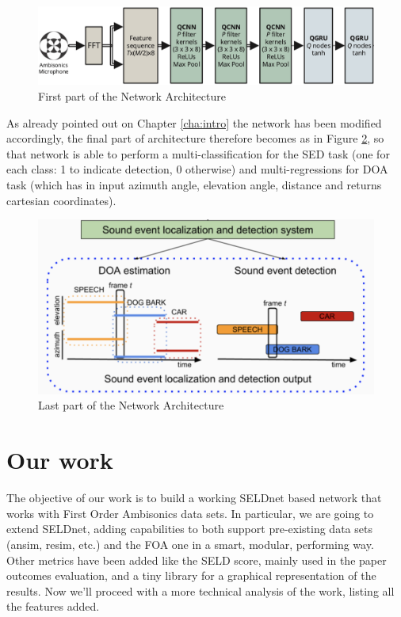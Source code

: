 \documentclass[11pt]{article}
\begin{document}
\begin{figure}[ht]
	\includegraphics[width=\linewidth]{img/arch1.png}
	\caption{First part of the Network Architecture}
	\label{fig:arch1}
\end{figure}

\noindent
As already pointed out on Chapter \ref{cha:intro} the network has been modified accordingly, the final part of architecture therefore becomes as in Figure \ref{fig:arch2}, so that network is able to perform a multi-classification for the SED task (one for each class: 1 to indicate detection, 0 otherwise) and multi-regressions for DOA task (which has in input azimuth angle, elevation angle, distance and returns cartesian coordinates).

\begin{figure}[ht]
	\centering
	\includegraphics[scale=0.5]{img/arch2.png}
	\caption{Last part of the Network Architecture}
	\label{fig:arch2}
\end{figure}

\newpage
\section{Our work}

The objective of our work is to build a working SELDnet based network that works with First Order Ambisonics data sets. In particular, we are going to extend SELDnet, adding capabilities to both support pre-existing data sets (ansim, resim, etc.) and the FOA one in a smart, modular, performing way. Other metrics have been added like the SELD score, mainly used in the paper \cite{paper2019} outcomes evaluation, and a tiny library for a graphical representation of the results. Now we'll proceed with a more technical analysis of the work, listing all the features added.
\end{document}
